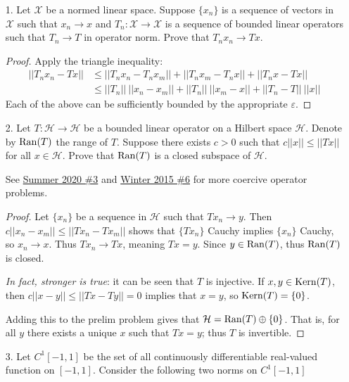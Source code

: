
\begin{itemize}
\item[1.] Let $\mathcal{X}$ be a normed linear space. Suppose $\{x_n\}$ is a sequence of vectors in $\mathcal{X}$ such that $x_n \rightarrow x$ and $T_n : \mathcal{X} \rightarrow \mathcal{X}$ is a sequence of bounded linear operators such that $T_n \rightarrow T$ in operator norm. Prove that $T_n x_n \rightarrow Tx$.
 
\begin{proof}
Apply the triangle inequality:
\begin{align*}
    ||T_n x_n - Tx|| &\leq ||T_n x_n - T_n x_m|| + ||T_n x_m - T_n x|| + ||T_n x - T x|| \\
    &\leq ||T_n|| \ ||x_n - x_m|| + ||T_n|| \ ||x_m - x|| + ||T_n - T|| \ ||x||
\end{align*}
Each of the above can be sufficiently bounded by the appropriate $\varepsilon$.
\end{proof}

\item[2.] Let $T:\mathcal{H} \rightarrow \mathcal{H}$ be a bounded linear operator on a Hilbert space $\mathcal{H}$. Denote by $\operatorname{Ran}(T)$ the range of $T$. Suppose there exists $c>0$ such that $c||x|| \leq ||Tx||$ for all $x \in \mathcal{H}$. Prove that $\operatorname{Ran}(T)$ is a closed subspace of $\mathcal{H}$.

\label{q:s20-3}
\label{q:w15-6}
See \hyperref[q:s20-3]{Summer 2020 \#3} and \hyperref[q:w15-6]{Winter 2015 \#6} for more coercive operator problems.

\begin{proof}
Let $\{x_n\}$ be a sequence in $\mathcal{H}$ such that $Tx_n \rightarrow y$. Then $c||x_n - x_m|| \leq ||Tx_n - Tx_m||$ shows that $\{Tx_n\}$ Cauchy implies $\{x_n\}$ Cauchy, so $x_n \rightarrow x$. Thus $Tx_n \rightarrow Tx$, meaning $Tx = y$. Since $y \in \operatorname{Ran}(T)$, thus $\operatorname{Ran}(T)$ is closed.

\medskip 

\textit{In fact, stronger is true}: it can be seen that $T$ is injective. If $x,y \in \operatorname{Kern}(T)$, then $c||x-y|| \leq ||Tx - Ty|| = 0$ implies that $x=y$, so $\operatorname{Kern}(T) = \{0\}$. 

Adding this to the prelim problem gives that $\mathcal{H} = \operatorname{Ran}(T) \oplus \{0\}$. That is, for all $y$ there exists a unique $x$ such that $Tx = y$; thus $T$ is invertible.
\end{proof}


\item[3.] Let $C^1[-1,1]$ be the set of all continuously differentiable real-valued function on $[-1,1]$. Consider the following two norms on $C^1[-1,1]$


\end{itemize}

